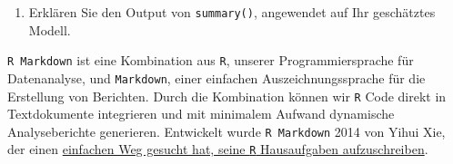 \begin{enumerate}

\item Erklären Sie den Output von \texttt{summary()}, angewendet auf Ihr geschätztes Modell.


\end{enumerate}


\texttt{R Markdown} ist eine Kombination aus \texttt{R}, unserer Programmiersprache für Datenanalyse, und \texttt{Markdown}, einer einfachen Auszeichnungssprache für die Erstellung von Berichten. Durch die Kombination können wir \texttt{R} Code direkt in Textdokumente integrieren und mit minimalem Aufwand dynamische Analyseberichte generieren. Entwickelt wurde \texttt{R Markdown} 2014 von Yihui Xie, der einen \href{https://www.youtube.com/watch?v=LussVnrLZKU}{einfachen Weg gesucht hat, seine \texttt{R} Hausaufgaben aufzuschreiben}.

